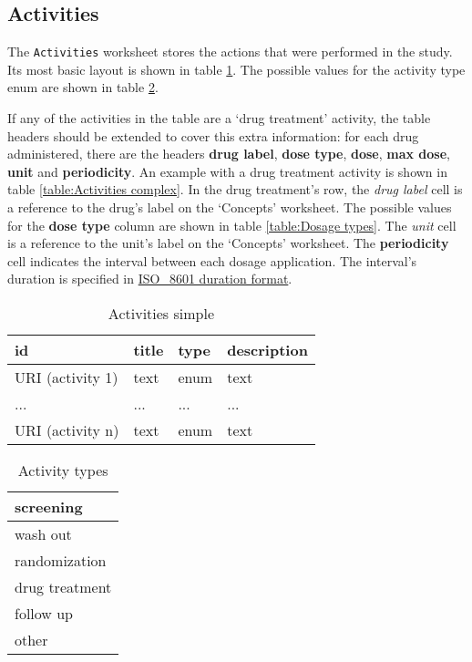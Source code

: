 \documentclass[a4paper,10pt]{article}
\begin{document}
\subsection{Activities}
The \texttt{Activities} worksheet stores the actions that were performed in the study. Its most basic layout is shown in table \ref{table:Activities simple}. The possible values for the activity type enum are shown in table \ref{table:Activity types}.

If any of the activities in the table are a `drug treatment' activity, the table headers should be extended to cover this extra information: for each drug administered, there are the headers \textbf{drug label}, \textbf{dose type}, \textbf{dose}, \textbf{max dose}, \textbf{unit} and \textbf{periodicity}. An example with a drug treatment activity is shown in table \ref{table:Activities complex}. In the drug treatment's row, the \textit{drug label} cell is a reference to the drug's label on the `Concepts' worksheet. The possible values for the \textbf{dose type} column are shown in table \ref{table:Dosage types}. The \textit{unit} cell is a reference to the unit's label on the `Concepts' worksheet. The \textbf{periodicity} cell indicates the interval between each dosage application. The interval's duration is specified in \href{https://en.wikipedia.org/wiki/ISO_8601#Durations}{ISO\_8601 duration format}.

\begin{table}[h!]
  \centering
  \caption{Activities simple}
  \small
  \label{table:Activities simple}
  \begin{tabular}{|l|l|l|l|}
    \hline
    \textbf{id} & \textbf{title} & \textbf{type} & \textbf{description} \\ \hline
    URI (activity 1) & text           & enum & text \\ \hline
    ...              & ...            & ...  & ...  \\ \hline
    URI (activity n) & text           & enum & text \\ \hline
  \end{tabular}
\end{table}

\begin{table}[h!]
  \centering
  \caption{Activity types}
  \small
  \label{table:Activity types}
  \begin{tabular}{|l|}
    \hline
    screening \\ \hline
    wash out \\ \hline
    randomization \\ \hline
    drug treatment \\ \hline
    follow up \\ \hline
    other \\ \hline
  \end{tabular}
\end{table}
\end{document}
